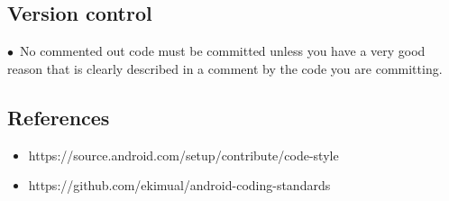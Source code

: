 \documentclass[english]{article}
\begin{document}
\subsection{Version control}
$\bullet$\ No commented out code must be committed unless you have a very good reason that is clearly described in a comment by the code you are committing. \par





		\subsection{References}
\begin{itemize}
			\item https://source.android.com/setup/contribute/code-style\\
			\item https://github.com/ekimual/android-coding-standards
		\end{itemize}
		
\end{document}
